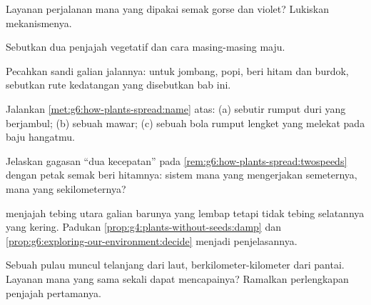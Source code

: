 \begin{exercise}[$\star$]\label{exo:g6:how-plants-spread:5}
Layanan perjalanan mana yang dipakai semak gorse dan  violet?
Lukiskan mekanismenya.
\end{exercise}

\begin{exercise}[$\star$]\label{exo:g6:how-plants-spread:6}
Sebutkan dua penjajah vegetatif dan cara masing-masing maju.
\end{exercise}

\begin{exercise}[$\star\star$]\label{exo:g6:how-plants-spread:7}
Pecahkan sandi galian jalannya: untuk jombang,  popi, beri hitam
dan burdok, sebutkan rute kedatangan yang disebutkan bab ini.
\end{exercise}

\begin{exercise}[$\star\star$]\label{exo:g6:how-plants-spread:8}
Jalankan \cref{met:g6:how-plants-spread:name} atas: (a) sebutir 
rumput duri yang berjambul; (b) sebuah  mawar; (c) sebuah bola
rumput lengket yang melekat pada baju hangatmu.
\end{exercise}

\begin{exercise}[$\star\star$]\label{exo:g6:how-plants-spread:9}
Jelaskan gagasan ``dua kecepatan'' pada
\cref{rem:g6:how-plants-spread:twospeeds} dengan petak semak beri
hitamnya: sistem mana yang mengerjakan semeternya, mana yang
sekilometernya?
\end{exercise}

\begin{exercise}[$\star\star$]\label{exo:g6:how-plants-spread:10}
 menjajah tebing utara galian barunya yang lembap tetapi
tidak tebing selatannya yang kering. Padukan
\cref{prop:g4:plants-without-seeds:damp} dan
\cref{prop:g6:exploring-our-environment:decide} menjadi penjelasannya.
\end{exercise}

\begin{exercise}[$\star\star$]\label{exo:g6:how-plants-spread:11}
Sebuah pulau muncul telanjang dari laut, berkilometer-kilometer dari
pantai. Layanan  mana yang sama sekali dapat mencapainya?
Ramalkan perlengkapan penjajah  pertamanya.
\end{exercise}

